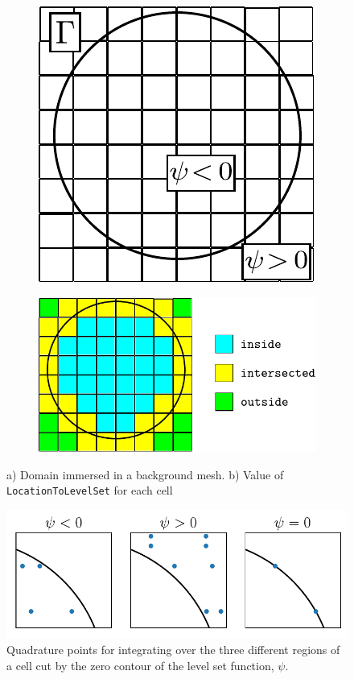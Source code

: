 \documentclass{ansarticle-preprint}
\begin{document}
\begin{figure}[h]
  \centering
  \begin{subfigure}[b]{0.3\textwidth}
    \centering
    \includegraphics[height=.12\paperheight]{svg/immersed-domain.pdf}
    \caption{\label{fig:immersed-domain}}
  \end{subfigure}
  \qquad
  \begin{subfigure}[b]{0.3\textwidth}
    \centering
    \includegraphics[height=.12\paperheight]{svg/location-to-level-set.pdf}
    \caption{ \label{fig:location-to-level-set}}
  \end{subfigure}
  \caption{a) Domain immersed in a background mesh. b) Value of \texttt{LocationToLevelSet} for each cell}
\end{figure}

\begin{figure}[h]
  \centering
  \includegraphics[width=.4\paperwidth]{svg/immersed_quadratures.pdf}
  \caption{Quadrature points for integrating over the three different regions of a cell cut by the zero contour of the level set function, $\psi$. \label{fig:immersed_quadratures}}
\end{figure}
\end{document}
